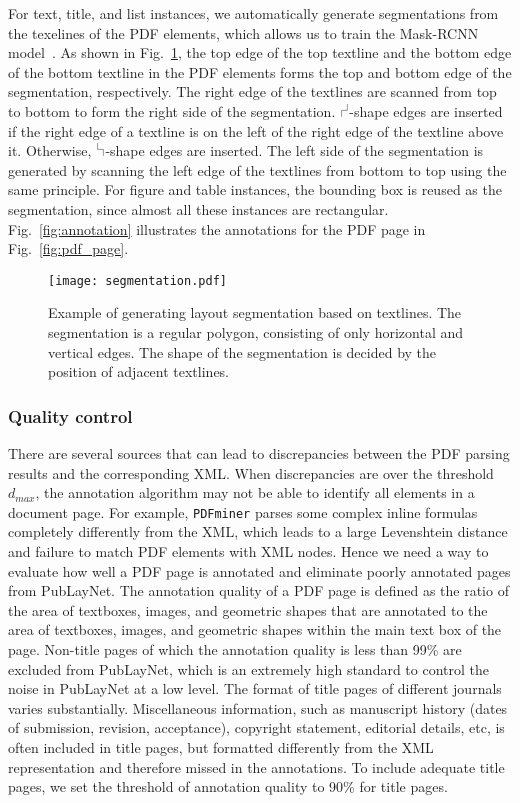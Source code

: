 \documentclass[conference]{IEEEtran}
\newcommand\LADot{\mathord{\mspace{1mu}\text{\ladot}\mspace{1mu}}}
\newcommand\ladot{\tikz[line cap=round,x=1ex,y=1ex,line width=0.3pt]
    {\draw (0,1) |- (1,0) -- (1,-1);}}
\newcommand\RADot{\mathord{\mspace{1mu}\text{\radot}\mspace{1mu}}}
\newcommand\radot{\tikz[line cap=round,x=1ex,y=1ex,line width=0.3pt]
    {\draw (1, 2) -- (1,1) -| (0,0);}}
\begin{document}
For text, title, and list instances, we automatically generate segmentations from the texelines of the PDF elements, which allows us to train the Mask-RCNN model~\cite{he2017mask}. As shown in Fig.~\ref{fig:seg}, the top edge of the top textline and the bottom edge of the bottom textline in the PDF elements forms the top and bottom edge of the segmentation, respectively. The right edge of the textlines are scanned from top to bottom to form the right side of the segmentation. $\RADot$-shape edges are inserted if the right edge of a textline is on the left of the right edge of the textline above it. Otherwise, $\LADot$-shape edges are inserted. The left side of the segmentation is generated by scanning the left edge of the textlines from bottom to top using the same principle. For figure and table instances, the bounding box is reused as the segmentation, since almost all these instances are rectangular. Fig.~\ref{fig:annotation} illustrates the annotations for the PDF page in Fig.~\ref{fig:pdf_page}.
\begin{figure}[!htb]
  \centering
  \texttt{[image: segmentation.pdf]}
  \caption{Example of generating layout segmentation based on textlines. The segmentation is a regular polygon, consisting of only horizontal and vertical edges. The shape of the segmentation is decided by the position of adjacent textlines.}
  \label{fig:seg}
\end{figure}

\subsubsection{Quality control}

There are several sources that can lead to discrepancies between the PDF parsing results and the corresponding XML. When discrepancies are over the threshold $d_{max}$, the annotation algorithm may not be able to identify all elements in a document page. For example, \texttt{PDFminer} parses some complex inline formulas completely differently from the XML, which leads to a large Levenshtein distance and failure to match PDF elements with XML nodes. Hence we need a way to evaluate how well a PDF page is annotated and eliminate poorly annotated pages from PubLayNet. The annotation quality of a PDF page is defined as the ratio of the area of textboxes, images, and geometric shapes that are annotated to the area of textboxes, images, and geometric shapes within the main text box of the page. Non-title pages of which the annotation quality is less than 99\% are excluded from PubLayNet, which is an extremely high standard to control the noise in PubLayNet at a low level. The format of title pages of different journals varies substantially. Miscellaneous information, such as manuscript history (dates of submission, revision, acceptance), copyright statement, editorial details, etc, is often included in title pages, but formatted differently from the XML representation and therefore missed in the annotations. To include adequate title pages, we set the threshold of annotation quality to 90\% for title pages.
\end{document}
